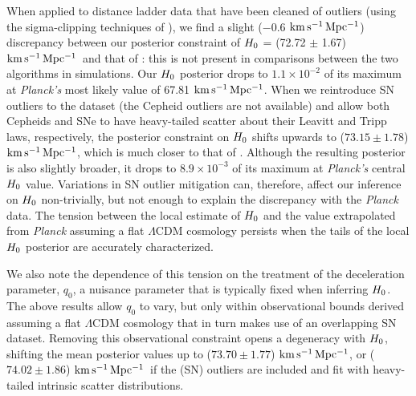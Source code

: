 \documentclass[a4paper,fleqn,usenatbib]{mnras}
\newcommand{\riess}{\citetalias{Riess_etal:2016}}
\newcommand{\decel}{\ensuremath{q_0}}
\newcommand{\kmsmpc}{\ensuremath{{\rm km\,s^{-1}\,Mpc^{-1}}}}
\begin{document}
{When applied to distance ladder data that have been cleaned of outliers (using the sigma-clipping techniques of \riess), we find a slight ($-0.6$ \kmsmpc) discrepancy between our posterior constraint of $H_0$ = (72.72 $\pm$ 1.67) \kmsmpc\ and that of \riess: this is not present in comparisons between the two algorithms in simulations. Our $H_0$ posterior drops to $1.1\times10^{-2}$ of its maximum at {\it Planck's} most likely value of 67.81 \kmsmpc. When we reintroduce SN outliers to the dataset (the Cepheid outliers are not available) and allow both Cepheids and SNe to have heavy-tailed scatter about their Leavitt and Tripp laws, respectively, the posterior constraint on $H_0$ shifts upwards to ($73.15 \pm 1.78$) \kmsmpc, which is much closer to that of \riess. Although the resulting posterior is also slightly broader, it drops to $8.9\times10^{-3}$ of its maximum at {\it Planck's} central $H_0$ value.  Variations in SN outlier mitigation can, therefore, affect our inference on $H_0$ non-trivially, but not enough to explain the discrepancy with the {\it Planck} data. The tension between the local estimate of $H_0$ and the value extrapolated from {\it Planck} assuming a flat $\Lambda$CDM cosmology persists when the tails of the local $H_0$ posterior are accurately characterized.

We also note the dependence of this tension on the treatment of the deceleration parameter, $\decel$, a nuisance parameter that is typically fixed when inferring $H_0$. The above results allow $\decel$ to vary, but only within observational bounds derived assuming a flat $\Lambda$CDM cosmology that in turn makes use of an overlapping SN dataset. Removing this observational constraint opens a degeneracy with $H_0$, shifting the mean posterior values up to ($73.70 \pm 1.77$) \kmsmpc, or ($74.02 \pm 1.86$) \kmsmpc\ if the (SN) outliers are included and fit with heavy-tailed intrinsic scatter distributions.

}
\end{document}
